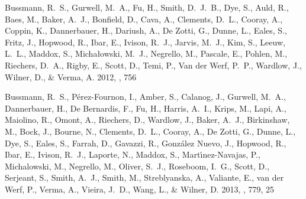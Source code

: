 \documentclass[iop]{emulateapj}
\begin{document}
\begin{thebibliography}{106}
{Bussmann}, R.~S., {Gurwell}, M.~A., {Fu}, H., {Smith}, D.~J.~B., {Dye}, S.,
  {Auld}, R., {Baes}, M., {Baker}, A.~J., {Bonfield}, D., {Cava}, A.,
  {Clements}, D.~L., {Cooray}, A., {Coppin}, K., {Dannerbauer}, H., {Dariush},
  A., {De Zotti}, G., {Dunne}, L., {Eales}, S., {Fritz}, J., {Hopwood}, R.,
  {Ibar}, E., {Ivison}, R.~J., {Jarvis}, M.~J., {Kim}, S., {Leeuw}, L.~L.,
  {Maddox}, S., {Micha{\l}owski}, M.~J., {Negrello}, M., {Pascale}, E.,
  {Pohlen}, M., {Riechers}, D.~A., {Rigby}, E., {Scott}, D., {Temi}, P., {Van
  der Werf}, P.~P., {Wardlow}, J., {Wilner}, D., \& {Verma}, A. 2012, \apj, 756

{Bussmann}, R.~S., {P{\'e}rez-Fournon}, I., {Amber}, S., {Calanog}, J.,
  {Gurwell}, M.~A., {Dannerbauer}, H., {De Bernardis}, F., {Fu}, H., {Harris},
  A.~I., {Krips}, M., {Lapi}, A., {Maiolino}, R., {Omont}, A., {Riechers}, D.,
  {Wardlow}, J., {Baker}, A.~J., {Birkinshaw}, M., {Bock}, J., {Bourne}, N.,
  {Clements}, D.~L., {Cooray}, A., {De Zotti}, G., {Dunne}, L., {Dye}, S.,
  {Eales}, S., {Farrah}, D., {Gavazzi}, R., {Gonz{\'a}lez Nuevo}, J.,
  {Hopwood}, R., {Ibar}, E., {Ivison}, R.~J., {Laporte}, N., {Maddox}, S.,
  {Mart{\'{\i}}nez-Navajas}, P., {Michalowski}, M., {Negrello}, M., {Oliver},
  S.~J., {Roseboom}, I.~G., {Scott}, D., {Serjeant}, S., {Smith}, A.~J.,
  {Smith}, M., {Streblyanska}, A., {Valiante}, E., {van der Werf}, P., {Verma},
  A., {Vieira}, J.~D., {Wang}, L., \& {Wilner}, D. 2013, \apj, 779, 25


\end{thebibliography}
\end{document}
